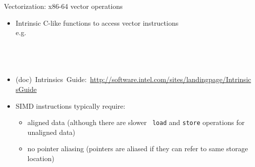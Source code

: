 \documentclass[10pt,xcolor=table]{beamer}
\begin{document}
\begin{frame}[fragile]{Vectorization: x86-64 vector operations}

  \begin{itemize}
  \item Intrinsic C-like functions to access vector instructions\\
    e.g.\\[0.2cm]
    \begin{columns}
       \
    \end{columns}

  \item[] \hspace*{-0.7cm} \mbox{\scriptsize \alert{(doc)} Intrinsics Guide: \url{http://software.intel.com/sites/landingpage/IntrinsicsGuide}}\\[0.2cm]
  \item SIMD instructions typically require:
    \begin{itemize}
    \item aligned data {\footnotesize (although there are slower {\tt
          load} and {\tt store} operations for unaligned data)}
    \item no pointer aliasing {\footnotesize (pointers are aliased if they can refer to same storage location)}
    \end{itemize}
  \end{itemize}

  \pause

  \begin{columns}
  \end{columns}
\end{frame}
\end{document}
